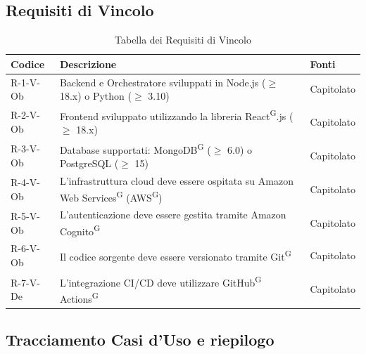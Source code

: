 \documentclass[a4paper, 11pt]{article}
\renewcommand{\arraystretch}{1.4} %
\begin{document}
\subsection{Requisiti di Vincolo}
\renewcommand{\arraystretch}{1.5}
\begin{longtable}[c]{ >{\centering\arraybackslash}m{2.5cm} >{\centering\arraybackslash}m{8.3cm} >{\centering\arraybackslash}m{3.5cm} }
    \caption{Tabella dei Requisiti di Vincolo} \\
    \rowcolor{AccentDark}
    \color{white}\textbf{Codice} & \color{white}\textbf{Descrizione} & \color{white}\textbf{Fonti} \\
    \endhead
    R-1-V-Ob & Backend e Orchestratore sviluppati in Node.js ($\geq$ 18.x) o Python ($\geq$ 3.10) & Capitolato \\
    R-2-V-Ob & Frontend sviluppato utilizzando la libreria React\textsuperscript{G}.js ($\geq$ 18.x) & Capitolato \\
    R-3-V-Ob & Database supportati: MongoDB\textsuperscript{G} ($\geq$ 6.0) o PostgreSQL ($\geq$ 15) & Capitolato \\
    R-4-V-Ob & L'infrastruttura cloud deve essere ospitata su Amazon Web Services\textsuperscript{G} (AWS\textsuperscript{G}) & Capitolato \\
    R-5-V-Ob & L'autenticazione deve essere gestita tramite Amazon Cognito\textsuperscript{G} & Capitolato \\
    R-6-V-Ob & Il codice sorgente deve essere versionato tramite Git\textsuperscript{G} & Capitolato \\
    R-7-V-De & L'integrazione CI/CD deve utilizzare GitHub\textsuperscript{G} Actions\textsuperscript{G} & Capitolato \\
\end{longtable}


\subsection{Tracciamento Casi d'Uso e riepilogo}
\end{document}
